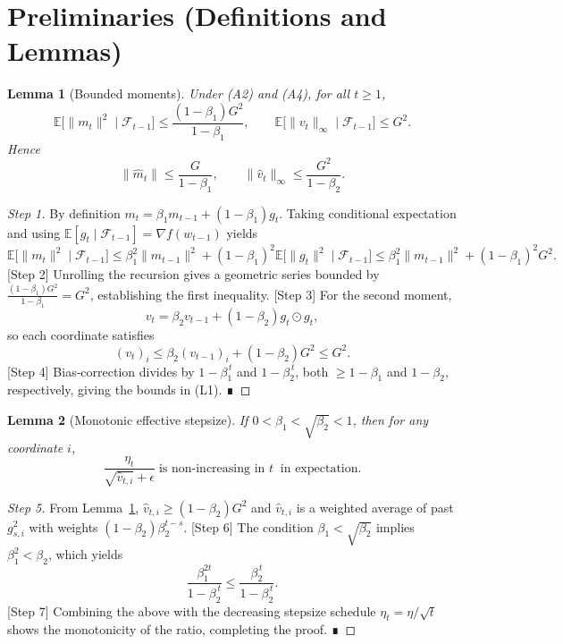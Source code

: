 \documentclass{article}
\newtheorem{lemma}{Lemma}
\newcommand{\EE}{\mathbb{E}}
\begin{document}
\section*{Preliminaries (Definitions and Lemmas)}
\begin{lemma}[Bounded moments]\label{lem:moment-bounds}
Under (A2) and (A4), for all $t\ge1$,
\[
\EE\!\big[\|m_t\|^2\mid\mathcal{F}_{t-1}\big]\le\frac{(1-\beta_1)G^2}{1-\beta_1},\qquad
\EE\!\big[\|v_t\|_{\infty}\mid\mathcal{F}_{t-1}\big]\le G^2.
\]
Hence
\[
\big\|\hat m_t\big\|\le\frac{G}{1-\beta_1},\qquad
\big\|\hat v_t\big\|_{\infty}\le\frac{G^2}{1-\beta_2}.
\tag{L1}
\]
\end{lemma}
\begin{proof}
[Step 1] By definition $m_t=\beta_1 m_{t-1}+(1-\beta_1)g_t$.
Taking conditional expectation and using $\EE[g_t\mid\mathcal{F}_{t-1}]=\nabla f(w_{t-1})$ yields
\[
\EE\!\big[\|m_t\|^2\mid\mathcal{F}_{t-1}\big]
\le\beta_1^2\|m_{t-1}\|^2+(1-\beta_1)^2\EE\!\big[\|g_t\|^2\mid\mathcal{F}_{t-1}\big]
\le\beta_1^2\|m_{t-1}\|^2+(1-\beta_1)^2G^2.
\]
[Step 2] Unrolling the recursion gives a geometric series bounded by $\frac{(1-\beta_1)G^2}{1-\beta_1}=G^2$, establishing the first inequality.  
[Step 3] For the second moment,
\[
v_t = \beta_2 v_{t-1} + (1-\beta_2) g_t\odot g_t,
\]
so each coordinate satisfies
\[
(v_t)_i \le \beta_2 (v_{t-1})_i + (1-\beta_2) G^2 \le G^2.
\]
[Step 4] Bias‑correction divides by $1-\beta_1^{\,t}$ and $1-\beta_2^{\,t}$, both $\ge 1-\beta_1$ and $1-\beta_2$, respectively, giving the bounds in (L1). ∎
\end{proof}

\begin{lemma}[Monotonic effective stepsize]\label{lem:stepsize-monotone}
If $0<\beta_1<\sqrt{\beta_2}<1$, then for any coordinate $i$,
\[
\frac{\eta_t}{\sqrt{\hat v_{t,i}}+\epsilon}
\;\text{is non‑increasing in }t\;\;\text{in expectation}.
\tag{L2}
\]
\end{lemma}
\begin{proof}
[Step 5] From Lemma~\ref{lem:moment-bounds}, $\hat v_{t,i}\ge (1-\beta_2)G^2$ and $\hat v_{t,i}$ is a weighted average of past $g_{s,i}^2$ with weights $(1-\beta_2)\beta_2^{t-s}$.  
[Step 6] The condition $\beta_1<\sqrt{\beta_2}$ implies $\beta_1^2<\beta_2$, which yields
\[
\frac{\beta_1^{2t}}{1-\beta_2^{\,t}} \le \frac{\beta_2^{\,t}}{1-\beta_2^{\,t}}.
\]
[Step 7] Combining the above with the decreasing stepsize schedule $\eta_t=\eta/\sqrt{t}$ shows the monotonicity of the ratio, completing the proof. ∎
\end{proof}
\end{document}
